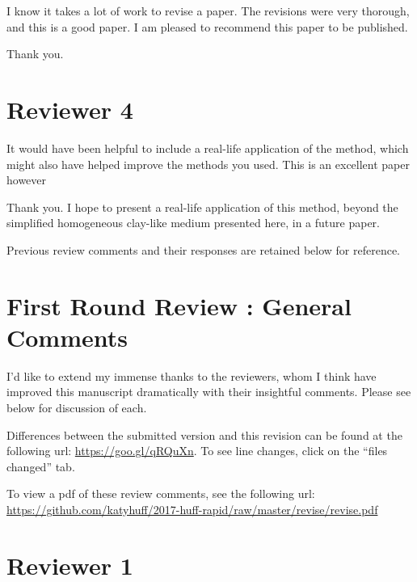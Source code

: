 \documentclass[answers,12pt]{exam}
\begin{document}
\begin{questions}
\question I know it takes a lot of work to revise a paper. The revisions were very thorough, and this is a good paper. I am pleased to recommend this paper to be published. 
\begin{solution}
        Thank you.
\end{solution}


\section*{Reviewer 4}

\question It would have been helpful to include a real-life application of the method, which might also have helped improve the methods you used.  This is an excellent paper however
\begin{solution}
Thank you. I hope to present a real-life application of this method, beyond the
simplified homogeneous clay-like medium presented here, in a future paper.
\end{solution}


\noindent\makebox[\linewidth]{\rule{\paperwidth}{0.4pt}}
Previous review comments and their responses are retained below for
reference.
\noindent\makebox[\linewidth]{\rule{\paperwidth}{0.4pt}}



\section*{First Round Review : General Comments}
I'd like to extend my immense thanks to the reviewers, whom I think have
improved this manuscript dramatically with their insightful comments. Please
see below for discussion of each.  

Differences between the submitted version and this revision can be found at the 
following url: \url{https://goo.gl/qRQuXn}. To see line changes, click on the 
``files changed'' tab.

To view a pdf of these review comments, see the following url:
\url{https://github.com/katyhuff/2017-huff-rapid/raw/master/revise/revise.pdf}

\section*{Reviewer 1}


\end{questions}
\end{document}
